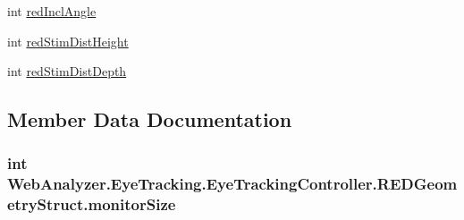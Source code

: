 \begin{DoxyCompactItemize}
\item 
int \hyperlink{struct_web_analyzer_1_1_eye_tracking_1_1_eye_tracking_controller_1_1_r_e_d_geometry_struct_aa4c57601e8cf5e495768cafa5b333c1d}{red\+Incl\+Angle}
\item 
int \hyperlink{struct_web_analyzer_1_1_eye_tracking_1_1_eye_tracking_controller_1_1_r_e_d_geometry_struct_afc1a34356d08aeac0d46ab9f1c2d96a2}{red\+Stim\+Dist\+Height}
\item 
int \hyperlink{struct_web_analyzer_1_1_eye_tracking_1_1_eye_tracking_controller_1_1_r_e_d_geometry_struct_aed6bb2570d776bf699d07a830458495b}{red\+Stim\+Dist\+Depth}
\end{DoxyCompactItemize}


\subsection{Member Data Documentation}
\hypertarget{struct_web_analyzer_1_1_eye_tracking_1_1_eye_tracking_controller_1_1_r_e_d_geometry_struct_a61e14d0fafb158a19d005e1d3b64d8e6}{}
\subsubsection[{monitor\+Size}]{\setlength{\rightskip}{0pt plus 5cm}int Web\+Analyzer.\+Eye\+Tracking.\+Eye\+Tracking\+Controller.\+R\+E\+D\+Geometry\+Struct.\+monitor\+Size}\label{struct_web_analyzer_1_1_eye_tracking_1_1_eye_tracking_controller_1_1_r_e_d_geometry_struct_a61e14d0fafb158a19d005e1d3b64d8e6}
\hypertarget{struct_web_analyzer_1_1_eye_tracking_1_1_eye_tracking_controller_1_1_r_e_d_geometry_struct_ae327f2e8a685f386458055047e083352}{}
